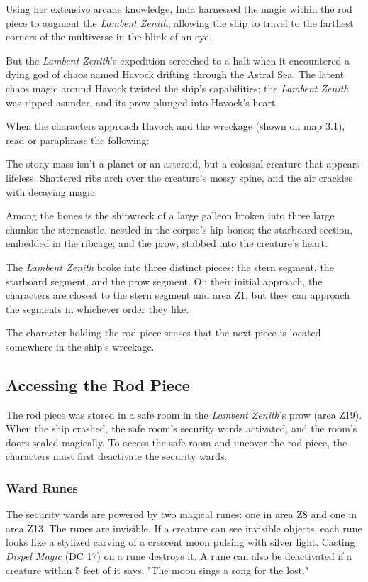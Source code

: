 \documentclass[10pt,a4paper,twoside,bg=print,twocolumn,openany,nodeprecatedcode]{dndbook}
\begin{document}
Using her extensive arcane knowledge, Inda harnessed the magic within the rod piece to augment the \textit{Lambent Zenith}, allowing the ship to travel to the farthest corners of the multiverse in the blink of an eye.

But the \textit{Lambent Zenith}'s expedition screeched to a halt when it encountered a dying god of chaos named Havock drifting through the Astral Sea. The latent chaos magic around Havock twisted the ship's capabilities; the \textit{Lambent Zenith} was ripped asunder, and its prow plunged into Havock's heart.

When the characters approach Havock and the wreckage (shown on map 3.1), read or paraphrase the following:

\begin{DndReadAloud}{}
The stony mass isn't a planet or an asteroid, but a colossal creature that appears lifeless. Shattered ribs arch over the creature's mossy spine, and the air crackles with decaying magic.

Among the bones is the shipwreck of a large galleon broken into three large chunks: the sterncastle, nestled in the corpse's hip bones; the starboard section, embedded in the ribcage; and the prow, stabbed into the creature's heart.

\end{DndReadAloud}

The \textit{Lambent Zenith} broke into three distinct pieces: the stern segment, the starboard segment, and the prow segment. On their initial approach, the characters are closest to the stern segment and area Z1, but they can approach the segments in whichever order they like.

The character holding the rod piece senses that the next piece is located somewhere in the ship's wreckage.

\subsection{Accessing the Rod Piece}
The rod piece was stored in a safe room in the \textit{Lambent Zenith}'s prow (area Z19). When the ship crashed, the safe room's security wards activated, and the room's doors sealed magically. To access the safe room and uncover the rod piece, the characters must first deactivate the security wards.

\subsubsection{Ward Runes}
The security wards are powered by two magical runes: one in area Z8 and one in area Z13. The runes are invisible. If a creature can see invisible objects, each rune looks like a stylized carving of a crescent moon pulsing with silver light. Casting \textit{Dispel Magic} (DC 17) on a rune destroys it. A rune can also be deactivated if a creature within 5 feet of it says, "The moon sings a song for the lost."
\end{document}
